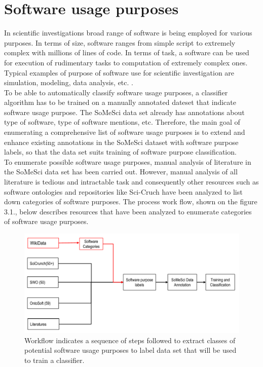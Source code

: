 \chapter{Software usage purposes}
\label{ch:purpose}

%
%
In scientific investigations broad range of software is being employed for various purposes. In terms of size, software ranges from simple script to extremely complex with millions of lines of code. In terms of task, a software can be used for execution of rudimentary tasks to computation of extremely complex ones. Typical examples of purpose of software use for scientific investigation are simulation, modeling, data analysis, etc. \citep{goble2014better}. \\


To be able to automatically classify software usage purposes, a classifier algorithm has to be trained on a manually annotated dateset that indicate software usage purpose. The \ac{SoMeSci} data set already has annotations about type of software, type of software mentions, etc. Therefore, the main goal of enumerating a comprehensive list of software usage purposes is to extend and enhance existing annotations in the SoMeSci dataset with software purpose labels, so that the data set suits training of software purpose classification. \\


To enumerate possible software usage purposes, manual analysis of literature in the SoMeSci data set has been carried out. However, manual analysis of all literature is tedious and intractable task and consequently other resources such as software ontologies and repositories like Sci-Cruch have been analyzed to list down categories of software purposes. The process work flow, shown on the figure 3.1., below describes resources that have been analyzed to enumerate categories of software usage purposes.

\begin{figure}[htbp]
	\centering
	\includegraphics[width=.80\textwidth]{4.graphics/figures/ch_3/softwarePurposeprocess}
	\caption{Workflow indicates a sequence of steps followed to extract classes of potential software usage purposes to label data set that will be used to train a classifier.}
	\label{fig:chapter03:setup}
\end{figure}


